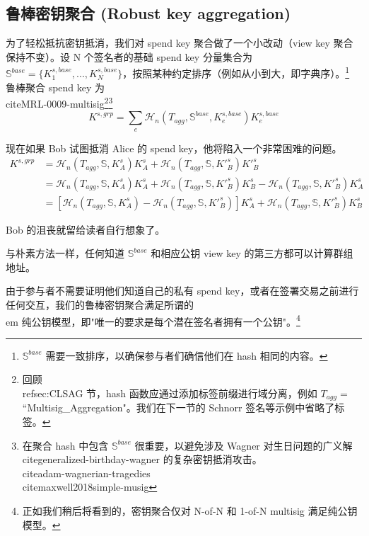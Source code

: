 \subsection{鲁棒密钥聚合 (Robust key aggregation)}
\label{sec:robust-key-aggregation}

为了轻松抵抗密钥抵消，我们对 spend key 聚合做了一个小改动（view key 聚合保持不变）。设 N 个签名者的基础 spend key 分量集合为 $\mathbb{S}^{base} = \{K^{s,base}_1,...,K^{s,base}_N\}$，按照某种约定排序（例如从小到大，即字典序）。\footnote{$\mathbb{S}^{base}$ 需要一致排序，以确保参与者们确信他们在 hash 相同的内容。} 鲁棒聚合 spend key 为 \\cite{MRL-0009-multisig}\footnote{回顾 \\ref{sec:CLSAG} 节，hash 函数应通过添加标签前缀进行域分离，例如 $T_{agg} =$ ``Multisig\_Aggregation"。我们在下一节的 Schnorr 签名等示例中省略了标签。}\footnote{在聚合 hash 中包含 $\mathbb{S}^{base}$ 很重要，以避免涉及 Wagner 对生日问题的广义解 \\cite{generalized-birthday-wagner} 的复杂密钥抵消攻击。\\cite{adam-wagnerian-tragedies} \\cite{maxwell2018simple-musig}}\vspace{.175cm}
\[K^{s,grp} = \sum_e \mathcal{H}_n(T_{agg},\mathbb{S}^{base},K^{s,base}_e)K^{s,base}_e\]

现在如果 Bob 试图抵消 Alice 的 spend key，他将陷入一个非常困难的问题。\vspace{.175cm}
\begin{align*}
    K^{s,grp} &= \mathcal{H}_n(T_{agg},\mathbb{S},K^{s}_A)K^{s}_A + \mathcal{H}_n(T_{agg},\mathbb{S},K'^{s}_B)K'^{s}_B \\
             &= \mathcal{H}_n(T_{agg},\mathbb{S},K^{s}_A)K^{s}_A + \mathcal{H}_n(T_{agg},\mathbb{S},K'^{s}_B)K^{s}_B - \mathcal{H}_n(T_{agg},\mathbb{S},K'^{s}_B)K^{s}_A \\
             &= [\mathcal{H}_n(T_{agg},\mathbb{S},K^{s}_A) - \mathcal{H}_n(T_{agg},\mathbb{S},K'^{s}_B)]K^{s}_A + \mathcal{H}_n(T_{agg},\mathbb{S},K'^{s}_B)K^{s}_B
\end{align*}

Bob 的沮丧就留给读者自行想象了。

与朴素方法一样，任何知道 $\mathbb{S}^{base}$ 和相应公钥 view key 的第三方都可以计算群组地址。

由于参与者不需要证明他们知道自己的私有 spend key，或者在签署交易之前进行任何交互，我们的鲁棒密钥聚合满足所谓的{\\em 纯公钥模型}，即"唯一的要求是每个潜在签名者拥有一个公钥"\cite{maxwell2018simple-musig}。\footnote{正如我们稍后将看到的，密钥聚合仅对 N-of-N 和 1-of-N multisig 满足纯公钥模型。}

